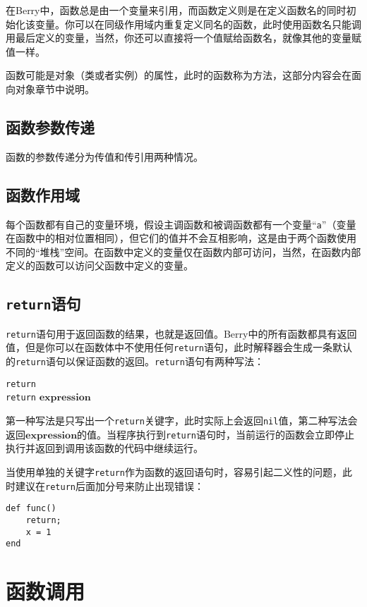 在Berry中，函数总是由一个变量来引用，而函数定义则是在定义函数名的同时初始化该变量。你可以在同级作用域内重复定义同名的函数，此时使用函数名只能调用最后定义的变量，当然，你还可以直接将一个值赋给函数名，就像其他的变量赋值一样。

函数可能是对象（类或者实例）的属性，此时的函数称为方法，这部分内容会在面向对象章节中说明。

\subsection{函数参数传递}

函数的参数传递分为传值和传引用两种情况。


\subsection{函数作用域}

每个函数都有自己的变量环境，假设主调函数和被调函数都有一个变量``\texttt{a}''（变量在函数中的相对位置相同），但它们的值并不会互相影响，这是由于两个函数使用不同的``堆栈''空间。在函数中定义的变量仅在函数内部可访问，当然，在函数内部定义的函数可以访问父函数中定义的变量。

\subsection{\texttt{return}语句}

\texttt{return}语句用于返回函数的结果，也就是返回值。Berry中的所有函数都具有返回值，但是你可以在函数体中不使用任何\texttt{return}语句，此时解释器会生成一条默认的\texttt{return}语句以保证函数的返回。\texttt{return}语句有两种写法：
\begin{algorithm}
    \texttt{return} \\
    \texttt{return} $\bm{expression}$
\end{algorithm}
第一种写法是只写出一个\texttt{return}关键字，此时实际上会返回\texttt{nil}值，第二种写法会返回$\bm{expression}$的值。当程序执行到\texttt{return}语句时，当前运行的函数会立即停止执行并返回到调用该函数的代码中继续运行。

当使用单独的关键字\texttt{return}作为函数的返回语句时，容易引起二义性的问题，此时建议在\texttt{return}后面加分号来防止出现错误：
\begin{lstlisting}[language=berry, numbers=none]
def func()
    return;
    x = 1
end
\end{lstlisting}

\section{函数调用}

